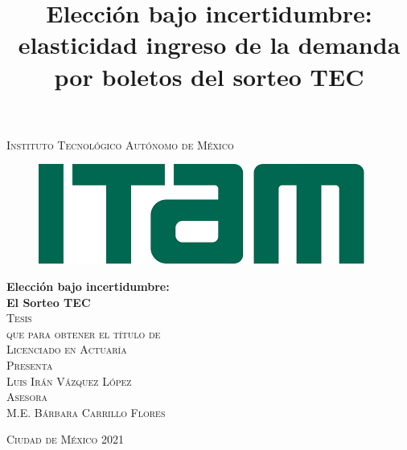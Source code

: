 \documentclass[11pt, oneside]{book}
\begin{document}

\title{Elección bajo incertidumbre: elasticidad ingreso de la demanda por boletos del sorteo TEC} %

\begin{titlepage}
\begin{center}

\textsc{\Large Instituto Tecnológico Autónomo de México}\\[2em]

\begin{figure}[h]
\begin{center}
\includegraphics[scale=0.50]{itam_logo.png}
\end{center}
\end{figure}


\textbf{\LARGE Elección bajo incertidumbre: \\El Sorteo TEC}\\[2em]

\textsc{\large Tesis}\\[1em]

\textsc{\large que para obtener el título de}\\[1em]

\textsc{\LARGE Licenciado en Actuaría}\\[1em]

\textsc{\large Presenta}\\[1em]

\textsc{\LARGE Luis Irán Vázquez López}\\[1em]

\textsc{\large Asesora}\\[1em]

\textsc{\LARGE M.E. Bárbara Carrillo Flores}\\[2em]


\end{center}

\vspace*{\fill}
\textsc{Ciudad de México \hspace*{\fill} 2021}

\end{titlepage}
\end{document}
